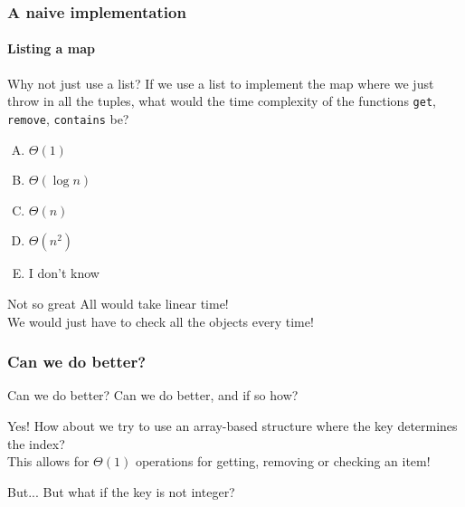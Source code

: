 \begin{frame}
	\frametitle{A naive implementation}
	\framesubtitle{Listing a map}

	\begin{questionblock}{Why not just use a list?}
		If we use a list to implement the map where we just throw in all the tuples, what would the time complexity
		of the functions \texttt{get}, \texttt{remove}, \texttt{contains} be?
		\pause
		\begin{enumerate}[A.]
			\item $\Theta(1)$
			\item $\Theta(\log n)$
			\item $\Theta(n)$
			\item $\Theta(n^2)$
			\item I don't know
		\end{enumerate}
	\end{questionblock}
	\pause
	\begin{alertblock}{Not so great}
		All would take linear time! \\
		We would just have to check all the objects every time!
	\end{alertblock}
\end{frame}

\begin{frame}
	\frametitle{Can we do better?}
	\begin{questionblock}{Can we do better?} 
		Can we do better, and if so how?
	\end{questionblock}	
	\pause
	\begin{answerblock}{Yes!}
		How about we try to use an array-based structure where the key determines the index?\\
		\pause
		This allows for $\Theta(1)$ operations for getting, removing or checking an item!
	\end{answerblock}
	\pause
	\begin{alertblock}{But...}
		But what if the key is not integer?
	\end{alertblock}
\end{frame}
